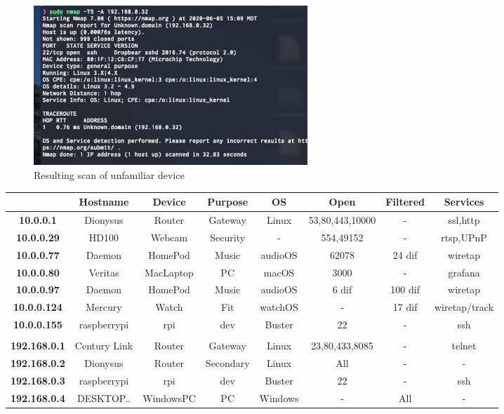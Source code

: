\documentclass[10pt]{article}
\begin{document}
\begin{figure}[H]
\centering
\includegraphics[width=0.5\textwidth]{images/unknown.png}
\caption{Resulting scan of unfamiliar device}\label{unknown image}
\end{figure}

\begin{table}[H]
  \begin{center}
  \begin{tabular}{ | c | c | c | c | c | c | c | c | } 
  \hline
   & \textbf{Hostname} & \textbf{Device} & \textbf{Purpose} & \textbf{OS} & \textbf{Open} & \textbf{Filtered}  & \textbf{Services}  \\  
   \hline
   \textbf{10.0.0.1} & Dionysus & Router & Gateway & Linux & 53,80,443,10000 & - & ssl,http \\  
   \hline
   \textbf{10.0.0.29}  & HD100 & Webcam & Security & - & 554,49152 & - & rtsp,UPnP \\  
   \hline
   \textbf{10.0.0.77}  & Daemon & HomePod & Music & audioOS & 62078 & 24 dif & wiretap\\  
   \hline
   \textbf{10.0.0.80}  & Veritas & MacLaptop & PC & macOS & 3000 & - & grafana \\  
   \hline
   \textbf{10.0.0.97}  & Daemon & HomePod & Music & audioOS & 6 dif & 100 dif & wiretap \\  
   \hline
   \textbf{10.0.0.124}  & Mercury & Watch & Fit & watchOS & - & 17 dif & wiretap/track \\  
   \hline
   \textbf{10.0.0.155}  & raspberrypi & rpi & dev & Buster & 22 & - & ssh \\  
   \hline
   \textbf{}  &  &  &   &  &  &  & \\  
   \hline
   \textbf{192.168.0.1}  & Century Link & Router & Gateway & Linux & 23,80,433,8085 & - & telnet\\  
   \hline
   \textbf{192.168.0.2}  & Dionysus & Router & Secondary & Linux & All & - & - \\  
   \hline
   \textbf{192.168.0.3}  & raspberrypi & rpi & dev & Buster & 22 & - & ssh \\  
   \hline
   \textbf{192.168.0.4}  & DESKTOP.. & WindowsPC & PC & Windows & - & All & - \\  

\end{tabular}
\end{center}
\end{table}
\end{document}
